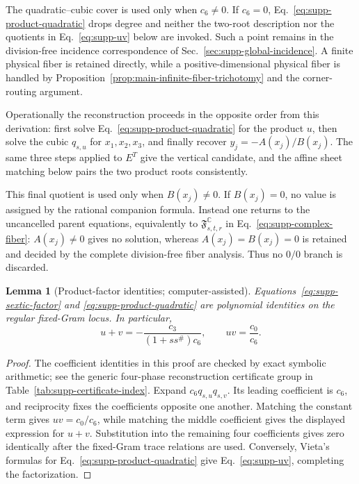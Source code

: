 \documentclass[aps,prx,reprint,nofootinbib,twoside,superscriptaddress,longbibliography,floatfix]{revtex4-2}
\newtheorem{lemma}[theorem]{Lemma}
\theoremstyle{definition}
\newcommand{\C}{\mathbb C}
\begin{document}
The quadratic--cubic cover is used only when $c_6\neq0$.  If $c_6=0$, Eq.~\eqref{eq:supp-product-quadratic} drops degree and neither the two-root description nor the quotients in Eq.~\eqref{eq:supp-uv} below are invoked. {Such a point remains in the division-free incidence correspondence of Sec.~\ref{sec:supp-global-incidence}. A finite physical fiber is retained directly, while a positive-dimensional physical fiber is handled by Proposition~\ref{prop:main-infinite-fiber-trichotomy} and the corner-routing argument.}

Operationally the reconstruction proceeds in the opposite order from this derivation: first solve Eq.~\eqref{eq:supp-product-quadratic} for the product $u$, then solve the cubic $q_{s,u}$ for $x_1,x_2,x_3$, and finally recover $y_j=-A(x_j)/B(x_j)$. The same three steps applied to $E^T$ give the vertical candidate, and the affine sheet matching below pairs the two product roots consistently.

This final quotient is used only when $B(x_j)\neq0$.  If $B(x_j)=0$, no value is assigned by the rational companion formula.  Instead one returns to the uncancelled parent equations, equivalently to $\mathfrak F^{\C}_{s,t,r}$ in Eq.~\eqref{eq:supp-complex-fiber}: $A(x_j)\neq0$ gives no solution, whereas $A(x_j)=B(x_j)=0$ is retained and decided by the complete division-free fiber analysis.  Thus no $0/0$ branch is discarded.

\begin{lemma}[Product-factor identities; computer-assisted]
\label{lem:supp-product-factor}
Equations~\eqref{eq:supp-sextic-factor} and \eqref{eq:supp-product-quadratic} are polynomial identities on the regular fixed-Gram locus.  In particular,
\begin{equation}
u+v=-\frac{c_3}{(1+ss^\#)c_6},\qquad
uv=\frac{c_0}{c_6}.
\label{eq:supp-uv}
\end{equation}
\end{lemma}

\begin{proof}
The coefficient identities in this proof are checked by exact symbolic arithmetic; see the generic four-phase reconstruction certificate group in Table~\ref{tab:supp-certificate-index}.
Expand $c_6q_{s,u}q_{s,v}$.  Its leading coefficient is $c_6$, and reciprocity fixes the coefficients opposite one another.  Matching the constant term gives $uv=c_0/c_6$, while matching the middle coefficient gives the displayed expression for $u+v$. Substitution into the remaining four coefficients gives zero identically after the fixed-Gram trace relations are used. Conversely, Vieta's formulas for Eq.~\eqref{eq:supp-product-quadratic} give Eq.~\eqref{eq:supp-uv}, completing the factorization.
\end{proof}
\end{document}

